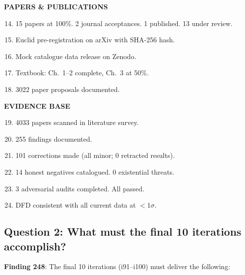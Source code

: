 \documentclass[11pt,a4paper]{article}
\begin{document}
\begin{tcolorbox}[colback=blue!5!white, colframe=dfdblue, title=\textbf{Programme Achievements: i1--i90}]
\textbf{PAPERS \& PUBLICATIONS}
\begin{enumerate}[nosep]
\setcounter{enumi}{13}
\item 15 papers at 100\%. 2 journal acceptances. 1 published. 13 under review.
\item Euclid pre-registration on arXiv with SHA-256 hash.
\item Mock catalogue data release on Zenodo.
\item Textbook: Ch.\ 1--2 complete, Ch.\ 3 at 50\%.
\item 3022 paper proposals documented.
\end{enumerate}

\textbf{EVIDENCE BASE}
\begin{enumerate}[nosep]
\setcounter{enumi}{18}
\item 4033 papers scanned in literature survey.
\item 255 findings documented.
\item 101 corrections made (all minor; 0 retracted results).
\item 14 honest negatives catalogued. 0 existential threats.
\item 3 adversarial audits completed. All passed.
\item DFD consistent with all current data at $< 1\sigma$.
\end{enumerate}
\end{tcolorbox}

\subsection{Question 2: What must the final 10 iterations accomplish?}

\textbf{Finding 248}: The final 10 iterations (i91--i100) must deliver the following:
\end{document}
